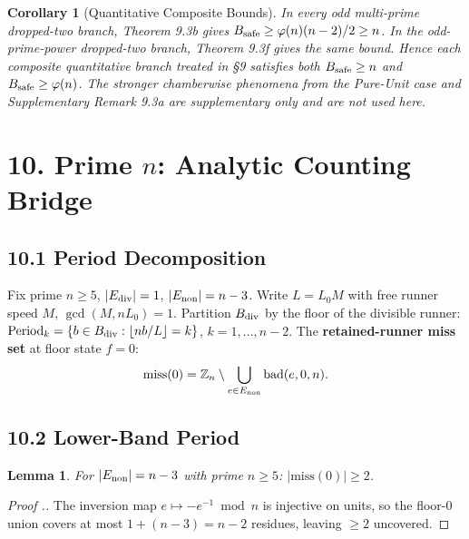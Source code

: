\documentclass[11pt,a4paper]{article}
\theoremstyle{plain}
\newtheorem{lemma}[theorem]{Lemma}
\newtheorem{corollary}[theorem]{Corollary}
\theoremstyle{definition}
\theoremstyle{remark}
\begin{document}
\begin{corollary}[Quantitative Composite Bounds]
In every odd multi-prime dropped-two branch, Theorem 9.3b gives $B_{\rm safe} \geq \varphi(n)(n-2)/2 \geq n$. In the odd-prime-power dropped-two branch, Theorem 9.3f gives the same bound. Hence each composite quantitative branch treated in §9 satisfies both $B_{\rm safe} \geq n$ and $B_{\rm safe} \geq \varphi(n)$. The stronger chamberwise phenomena from the Pure-Unit case and Supplementary Remark 9.3a are supplementary only and are not used here.

\end{corollary}


\medskip



\section{10. Prime $n$: Analytic Counting Bridge}



\subsection{10.1 Period Decomposition}


Fix prime $n \geq 5$, $|E_{\rm div}|=1$, $|E_{\rm non}|=n-3$. Write $L = L_0 M$ with free runner speed $M$, $\gcd(M, nL_0)=1$. Partition $B_{\rm div}$ by the floor of the divisible runner: $\mathrm{Period}_k = \{b \in B_{\rm div} : \lfloor nb/L \rfloor = k\}$, $k = 1,\ldots,n-2$. The \textbf{retained-runner miss set} at floor state $f=0$:
\[\mathrm{miss}(0) = \mathbb{Z}_n \setminus \bigcup_{e \in E_{\rm non}} \mathrm{bad}(e, 0, n).\]


\subsection{10.2 Lower-Band Period}



\begin{lemma}
For $|E_{\rm non}|=n-3$ with prime $n \geq 5$: $|\mathrm{miss}(0)| \geq 2$.

\end{lemma}

\begin{proof}[Proof .]
The inversion map $e \mapsto -e^{-1} \bmod n$ is injective on units, so the floor-0 union covers at most $1 + (n-3) = n-2$ residues, leaving $\geq 2$ uncovered.
\end{proof}
\end{document}
